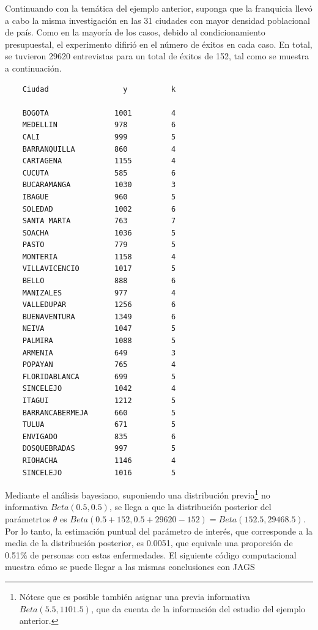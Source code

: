 \documentclass[10pt,openright]{book}\usepackage[]{graphicx}\usepackage[]{color}
\begin{document}
    \begin{Eje}\label{Eje1.3.2}
    Continuando con la tem\'atica del ejemplo anterior, suponga que la franquicia llev\'o a cabo la misma investigaci\'on en las 31 ciudades con mayor densidad poblacional de pa\'is. Como en la mayor\'ia de los casos, debido al condicionamiento presupuestal, el experimento difiri\'o en el n\'umero de \'exitos en cada caso. En total, se tuvieron 29620 entrevistas para un total de \'exitos de 152, tal como se muestra a continuaci\'on.
    
    \begin{center}
    \begin{verbatim}
    Ciudad                 y          k
    
    BOGOTA               1001         4
    MEDELLIN             978          6
    CALI                 999          5
    BARRANQUILLA         860          4
    CARTAGENA            1155         4
    CUCUTA               585          6
    BUCARAMANGA          1030         3
    IBAGUE               960          5
    SOLEDAD              1002         6
    SANTA MARTA          763          7
    SOACHA               1036         5
    PASTO                779          5
    MONTERIA             1158         4
    VILLAVICENCIO        1017         5
    BELLO                888          6
    MANIZALES            977          4
    VALLEDUPAR           1256         6
    BUENAVENTURA         1349         6
    NEIVA                1047         5
    PALMIRA              1088         5
    ARMENIA              649          3
    POPAYAN              765          4
    FLORIDABLANCA        699          5
    SINCELEJO            1042         4
    ITAGUI               1212         5
    BARRANCABERMEJA      660          5
    TULUA                671          5
    ENVIGADO             835          6
    DOSQUEBRADAS         997          5
    RIOHACHA             1146         4
    SINCELEJO            1016         5 
    \end{verbatim}
    \end{center}
    
    Mediante el an\'alisis bayesiano, suponiendo una distribuci\'on previa\footnote{N\'otese que es posible tambi\'en asignar una previa informativa $Beta(5.5, 1101.5)$, que da cuenta de la informaci\'on del estudio del ejemplo anterior.} no informativa $Beta(0.5, 0.5)$, se llega a que la distribuci\'on posterior del par\'ametrtos $\theta$ es $Beta(0.5+152, 0.5+29620-152)=Beta(152.5, 29468.5)$. Por lo tanto, la estimaci\'on puntual del par\'ametro de inter\'es, que corresponde a la media de la distribuci\'on posterior, es 0.0051, que equivale una proporci\'on de 0.51\% de personas con estas enfermedades. El siguiente c\'odigo computacional muestra c\'omo se puede llegar a las mismas conclusiones con JAGS
    

\end{Eje}
\end{document}
